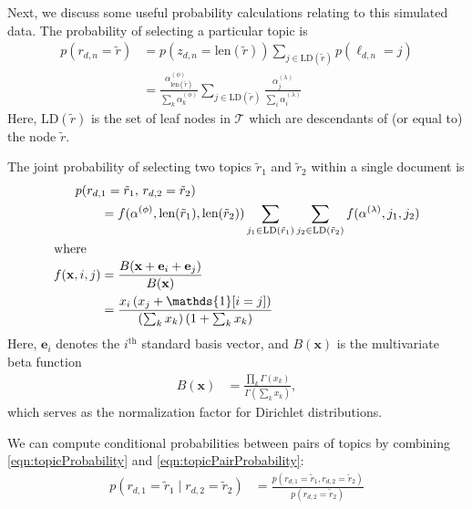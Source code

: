 \documentclass{article}
\newcommand{\nth}{^{\text{th}}}
\newcommand{\len}{\text{len}}
\newcommand{\indicator}{\mathds{1}}
\begin{document}
Next, we discuss some useful probability calculations relating to this simulated data.
The probability of selecting a particular topic is
\begin{align}
p(r_{d,n} = \tilde r)
&= p(z_{d,n} = \len(\tilde r)) \sum_{j \in \text{LD}(\tilde r)} p(\ell_{d,n} = j) \\
&= \frac{\alpha^{(\phi)}_{\len(\tilde r)}}{\sum_k \alpha^{(\phi)}_k} \sum_{j \in \text{LD}(\tilde r)} \frac{\alpha^{(\lambda)}_j}{\sum_i \alpha^{(\lambda)}_i} \label{eqn:topicProbability}
\end{align}
Here, $\text{LD}(\tilde r)$ is the set of leaf nodes in $\mathcal T$ which are descendants of (or equal to) the node $\tilde r$.

The joint probability of selecting two topics $\tilde r_1$ and $\tilde r_2$ within a single document is
\begin{align}
\MoveEqLeft
p(r_{d,1} = \tilde r_1, \, r_{d,2} = \tilde r_2) \nonumber \\
&= f(\alpha^{(\phi)}, \len(\tilde r_1), \len(\tilde r_2))
  \sum_{j_1 \in \text{LD}(\tilde r_1)}
  \sum_{j_2 \in \text{LD}(\tilde r_2)}
    f(\alpha^{(\lambda)}, j_1, j_2) \label{eqn:topicPairProbability} \\
\intertext{where}
f(\mathbf x, i, j)
&=
\frac{B(\mathbf x + \mathbf e_i + \mathbf e_j)}{B(\mathbf x)}
\\
&=
\frac{x_i \left( x_j + \indicator[i = j] \right)}{\left(\sum_k x_k\right) \left(1 + \sum_k x_k\right)}
\end{align}
Here, $\mathbf e_i$ denotes the $i\nth$ standard basis vector, and $B(\mathbf x)$ is the multivariate beta function
\begin{align}
B(\mathbf x)
&= \frac{\prod_k \Gamma(x_k)}{\Gamma\left(\sum_k x_k\right)},
\end{align}
which serves as the normalization factor for Dirichlet distributions.

We can compute conditional probabilities between pairs of topics by combining \eqref{eqn:topicProbability} and \eqref{eqn:topicPairProbability}:
\begin{align}
p(r_{d,1} = \tilde r_1 \mid r_{d,2} = \tilde r_2)
&= \frac{ p(r_{d,1} = \tilde r_1, r_{d,2} = \tilde r_2) }{ p(r_{d,2} = \tilde r_2) }
\end{align}
\end{document}

